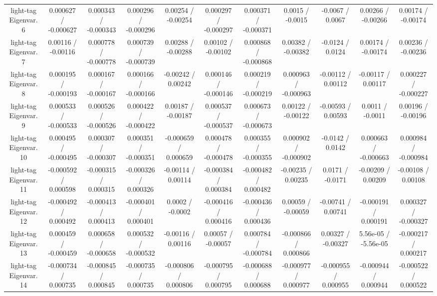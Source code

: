 \begin{table}[htbp]
\begin{center}
\begin{tabular}{|c|c|c|c|c|c|c|c|c|c|c|}
  light-tag Eigenvar. 6 & 0.000627 / -0.000627 & 0.000343 / -0.000343 & 0.000296 / -0.000296 & 0.00254 / -0.00254 & 0.000297 / -0.000297 & 0.000371 / -0.000371 & 0.0015 / -0.0015 & -0.0067 / 0.0067 & 0.00266 / -0.00266 & 0.00174 / -0.00174 \\ 
  light-tag Eigenvar. 7 & 0.00116 / -0.00116 & 0.000778 / -0.000778 & 0.000739 / -0.000739 & 0.00288 / -0.00288 & 0.00102 / -0.00102 & 0.000868 / -0.000868 & 0.00382 / -0.00382 & -0.0124 / 0.0124 & 0.00174 / -0.00174 & 0.00236 / -0.00236 \\ 
  light-tag Eigenvar. 8 & 0.000195 / -0.000193 & 0.000167 / -0.000167 & 0.000166 / -0.000166 & -0.00242 / 0.00242 & 0.000146 / -0.000146 & 0.000219 / -0.000219 & 0.000963 / -0.000963 & -0.00112 / 0.00112 & -0.00117 / 0.00117 & 0.000227 / -0.000227 \\ 
  light-tag Eigenvar. 9 & 0.000533 / -0.000533 & 0.000526 / -0.000526 & 0.000422 / -0.000422 & 0.00187 / -0.00187 & 0.000537 / -0.000537 & 0.000673 / -0.000673 & 0.00122 / -0.00122 & -0.00593 / 0.00593 & 0.0011 / -0.0011 & 0.00196 / -0.00196 \\ 
  light-tag Eigenvar. 10 & 0.000495 / -0.000495 & 0.000307 / -0.000307 & 0.000351 / -0.000351 & -0.000659 / 0.000659 & 0.000478 / -0.000478 & 0.000355 / -0.000355 & 0.000902 / -0.000902 & -0.0142 / 0.0142 & 0.000663 / -0.000663 & 0.000984 / -0.000984 \\ 
  light-tag Eigenvar. 11 & -0.000592 / 0.000598 & -0.000315 / 0.000315 & -0.000326 / 0.000326 & -0.00114 / 0.00114 & -0.000384 / 0.000384 & -0.000482 / 0.000482 & -0.00235 / 0.00235 & 0.0171 / -0.0171 & -0.00209 / 0.00209 & -0.00108 / 0.00108 \\ 
  light-tag Eigenvar. 12 & -0.000492 / 0.000492 & -0.000413 / 0.000413 & -0.000401 / 0.000401 & 0.0002 / -0.0002 & -0.000416 / 0.000416 & -0.000436 / 0.000436 & 0.00059 / -0.00059 & -0.00741 / 0.00741 & -0.000191 / 0.000191 & 0.000327 / -0.000327 \\ 
  light-tag Eigenvar. 13 & 0.000459 / -0.000459 & 0.000658 / -0.000658 & 0.000532 / -0.000532 & -0.00116 / 0.00116 & 0.00057 / -0.00057 & 0.000784 / -0.000784 & -0.000866 / 0.000866 & 0.00327 / -0.00327 & 5.56e-05 / -5.56e-05 & -0.000217 / 0.000217 \\ 
  light-tag Eigenvar. 14 & -0.000734 / 0.000735 & -0.000845 / 0.000845 & -0.000735 / 0.000735 & -0.000806 / 0.000806 & -0.000795 / 0.000795 & -0.000688 / 0.000688 & -0.000977 / 0.000977 & -0.000955 / 0.000955 & -0.000944 / 0.000944 & -0.000522 / 0.000522 \\ 

\end{tabular}
\end{center}
\end{table}

